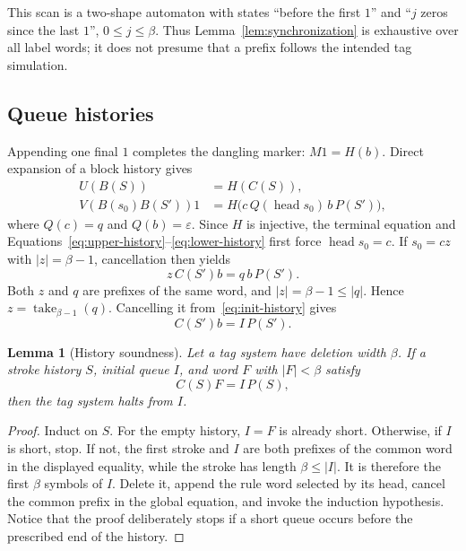 \documentclass[11pt]{article}
\newtheorem{lemma}[theorem]{Lemma}
\newcommand{\eps}{\varepsilon}
\begin{document}
This scan is a two-shape automaton with states ``before the first $1$'' and ``$j$ zeros since
the last $1$'', $0\leq j\leq\beta$.  Thus Lemma~\ref{lem:synchronization} is exhaustive over
all label words; it does not presume that a prefix follows the intended tag simulation.

\subsection{Queue histories}

Appending one final $1$ completes the dangling marker: $M1=H(b)$.  Direct expansion of a
block history gives
\begin{align}
 U(B(S))&=H(C(S)),\label{eq:upper-history}\\
 V(B(s_0)B(S'))1
   &=H\bigl(c\,Q(\operatorname{head}s_0)\,b\,P(S')\bigr),
                                                        \label{eq:lower-history}
\end{align}
where $Q(c)=q$ and $Q(b)=\eps$.  Since $H$ is injective, the terminal equation and
Equations~\eqref{eq:upper-history}--\eqref{eq:lower-history} first force
$\operatorname{head}s_0=c$.  If $s_0=c z$ with $|z|=\beta-1$, cancellation then yields
\begin{equation}\label{eq:init-history}
  z\,C(S')b=q\,b\,P(S').
\end{equation}
Both $z$ and $q$ are prefixes of the same word, and $|z|=\beta-1\leq |q|$.  Hence
$z=\operatorname{take}_{\beta-1}(q)$.  Cancelling it from~\eqref{eq:init-history} gives
\begin{equation}\label{eq:queue-certificate}
  C(S')b=I\,P(S').
\end{equation}

\begin{lemma}[History soundness]\label{lem:history}
Let a tag system have deletion width $\beta$.  If a stroke history $S$, initial queue $I$,
and word $F$ with $|F|<\beta$ satisfy
\[
  C(S)F=I\,P(S),
\]
then the tag system halts from $I$.
\end{lemma}

\begin{proof}
Induct on $S$.  For the empty history, $I=F$ is already short.  Otherwise, if $I$ is short,
stop.  If not, the first stroke and $I$ are both prefixes of the common word in the displayed
equality, while the stroke has length $\beta\leq|I|$.  It is therefore the first $\beta$
symbols of $I$.  Delete it, append the rule word selected by its head, cancel the common
prefix in the global equation, and invoke the induction hypothesis.  Notice that the proof
deliberately stops if a short queue occurs before the prescribed end of the history.
\end{proof}
\end{document}

